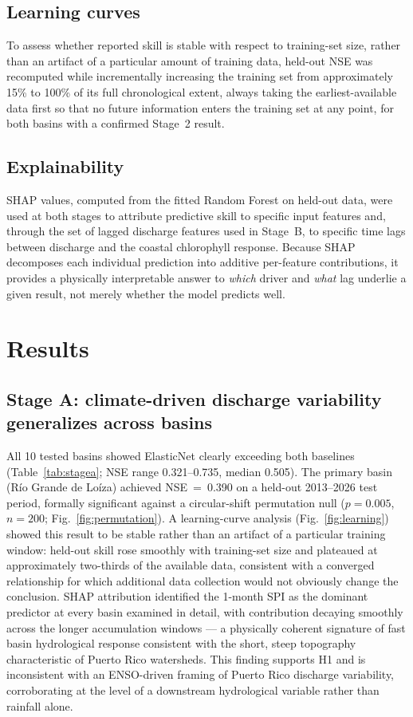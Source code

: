 \documentclass[preprint,12pt]{elsarticle}
\begin{document}
\subsection{Learning curves}
To assess whether reported skill is stable with respect to training-set size, rather than an artifact of a particular amount of training data, held-out NSE was recomputed while incrementally increasing the training set from approximately 15\% to 100\% of its full chronological extent, always taking the earliest-available data first so that no future information enters the training set at any point, for both basins with a confirmed Stage~2 result.

\subsection{Explainability}
SHAP \citep[SHapley Additive exPlanations;][]{lundberg2017unified} values, computed from the fitted Random Forest on held-out data, were used at both stages to attribute predictive skill to specific input features and, through the set of lagged discharge features used in Stage~B, to specific time lags between discharge and the coastal chlorophyll response. Because SHAP decomposes each individual prediction into additive per-feature contributions, it provides a physically interpretable answer to \emph{which} driver and \emph{what} lag underlie a given result, not merely whether the model predicts well.

\section{Results}

\subsection{Stage A: climate-driven discharge variability generalizes across basins}
All 10 tested basins showed ElasticNet clearly exceeding both baselines (Table~\ref{tab:stagea}; NSE range 0.321--0.735, median 0.505). The primary basin (Río Grande de Loíza) achieved NSE~=~0.390 on a held-out 2013--2026 test period, formally significant against a circular-shift permutation null ($p=0.005$, $n=200$; Fig.~\ref{fig:permutation}). A learning-curve analysis (Fig.~\ref{fig:learning}) showed this result to be stable rather than an artifact of a particular training window: held-out skill rose smoothly with training-set size and plateaued at approximately two-thirds of the available data, consistent with a converged relationship for which additional data collection would not obviously change the conclusion. SHAP attribution identified the 1-month SPI as the dominant predictor at every basin examined in detail, with contribution decaying smoothly across the longer accumulation windows --- a physically coherent signature of fast basin hydrological response consistent with the short, steep topography characteristic of Puerto Rico watersheds. This finding supports H1 and is inconsistent with an ENSO-driven framing of Puerto Rico discharge variability, corroborating \citet{torresvalcarcel2018enso} at the level of a downstream hydrological variable rather than rainfall alone.
\end{document}
